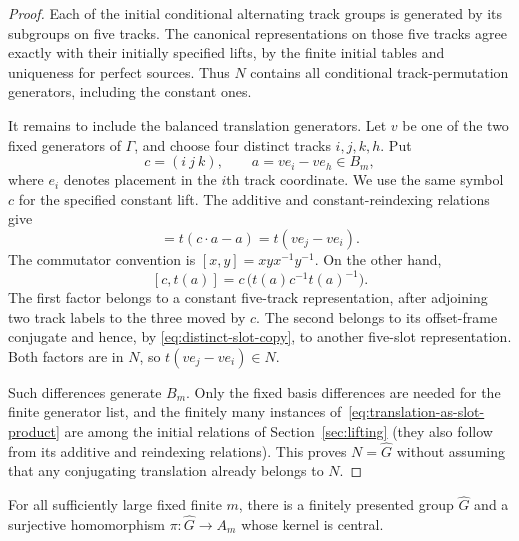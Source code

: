 \begin{proof}
Each of the initial conditional alternating track groups is generated
by its subgroups on five tracks.  The canonical representations on those
five tracks agree exactly with their initially specified lifts, by the
finite initial tables and uniqueness for perfect sources.  Thus $N$
contains all conditional track-permutation generators, including the
constant ones.

It remains to include the balanced translation generators.  Let $v$ be
one of the two fixed generators of $\Gamma$, and choose four distinct
tracks $i,j,k,h$.  Put
\[
 c=(i\ j\ k),\qquad a=v e_i-v e_h\in B_m,
\]
where $e_i$ denotes placement in the $i$th track coordinate.  We use the
same symbol $c$ for the specified constant lift.  The additive and
constant-reindexing relations give
\begin{equation}
 [c,t(a)]=t(c\cdot a-a)=t(v e_j-v e_i).
 \label{eq:translation-as-slot-product}
\end{equation}
The commutator convention is $[x,y]=xyx^{-1}y^{-1}$.  On the other hand,
\[
 [c,t(a)]=c\,\bigl(t(a)c^{-1}t(a)^{-1}\bigr).
\]
The first factor belongs to a constant five-track representation, after
adjoining two track labels to the three moved by $c$.  The second belongs
to its offset-frame conjugate and hence, by
\eqref{eq:distinct-slot-copy}, to another five-slot representation.
Both factors are in $N$, so $t(v e_j-v e_i)\in N$.

Such differences generate $B_m$.  Only the fixed basis differences
are needed for the finite generator list, and the finitely many instances
of~\eqref{eq:translation-as-slot-product} are among the initial relations
of Section~\ref{sec:lifting} (they also follow from its additive and
reindexing relations).  This proves $N=\widehat G$ without assuming that
any conjugating translation already belongs to $N$.
\end{proof}

\begin{theorem}\label{thm:central-cover}
For all sufficiently large fixed finite $m$, there is a finitely
presented group $\widehat G$ and a surjective homomorphism
$\pi:\widehat G\to A_m$ whose kernel is central.
\end{theorem}

